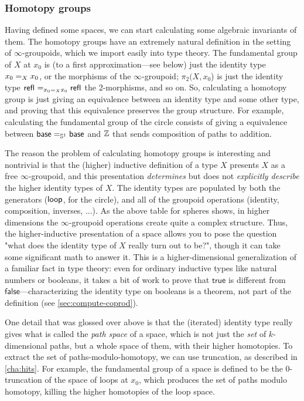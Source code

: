 \subsubsection{Homotopy groups}  Having defined some spaces, we can start
  calculating some algebraic invariants of them.  The homotopy groups
  have an extremely natural definition in the setting of
  $\infty$-groupoids, which we import easily into type theory.  The fundamental group of $X$ at $x_0$
  is (to a first approximation---see below) just the identity type
  $\id[X] {x_0} {x_0}$, or the morphisms of the $\infty$-groupoid;
  $\pi_2(X,x_0$) is just the identity type $\id[{\id[X] {x_0} {x_0}}]
  {\refl{}}{\refl{}}$ the 2-morphisms, and so on.  So, calculating a
  homotopy group is just giving an equivalence between an identity type
  and some other type, and proving that this equivalence preserves the
  group structure.  For example, calculating the fundamental group of
  the circle consists of giving a equivalence between $\id[{\Sn ^1}]
  \base \base$ and $\Z$ that sends composition of paths to
  addition.

The reason the problem of calculating homotopy groups is interesting and nontrivial is that the (higher) inductive
definition of a type $X$ presents $X$ as a free $\infty$-groupoid, and this
presentation \emph{determines} but does not \emph{explicitly describe}
the higher identity types of $X$.  The identity types are populated by
both the generators ($\lloop$, for the circle), and all of the groupoid
operations (identity, composition, inverses, ...).  As the above table
for spheres shows, in higher dimensions the $\infty$-groupoid operations
create quite a complex structure.  Thus, the higher-inductive
presentation of a space allows you to pose the question "what does the
identity type of $X$ really turn out to be?", though it can take some
significant math to answer it.  This is a higher-dimensional
generalization of a familiar fact in type theory: even for ordinary
inductive types like natural numbers or booleans, it takes a bit of work
to prove that $\mathsf{true}$ is different from $\mathsf{false}$---characterizing the
identity type on booleans is a theorem, not part of the definition
(see \autoref{sec:compute-coprod}).

One detail that was glossed over above is that the (iterated) identity
type really gives what is called the \emph{path space} of a space, which
is not just the \emph{set} of $k$-dimensional paths, but a whole space
of them, with their higher homotopies.  To extract the set of
paths-modulo-homotopy, we can use truncation, as described in
\autoref{cha:hits}.  For example, the fundamental group of a
space is defined to be the 0-truncation of the space of loops at $x_0$,
which produces the set of paths modulo homotopy, killing the higher
homotopies of the loop space.

